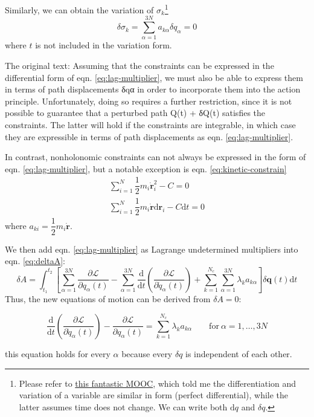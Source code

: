 \documentclass[
  10pt,
  twoside,
  openany,
  b5paper, %
  colorscheme = bootstrap-v4, %
]{qyxf-book}
\numberwithin{equation}{section}
\newcommand{\md}{\mathrm{d}}
\newcommand{\der}[2]{\dfrac{\md #1}{\md #2}}
\newcommand{\p}[2]{\dfrac{\partial #1}{\partial #2}}
\newcommand{\vr}{\boldsymbol{r}}
\newcommand{\vq}{\boldsymbol{q}}
\newcommand{\dvr}{\dot{\vr}}
\newcommand{\dt}{\mathrm{d}t}
\newcommand{\half}{\dfrac{1}{2}}
\newcommand{\sumin}{\sum_{i=1}^N}
\newcommand{\suman}{\sum_{\alpha=1}^{3N}}
\newcommand{\lag}{\mathcal{L}} %
\newcommand{\inttot}{\int_{t_1}^{t_2}}
\begin{document}
Similarly, we can obtain the variation of $\sigma_k$\footnote{Please refer to \href{https://www.bilibili.com/video/BV1xJ411s78q?p=59}{this fantastic MOOC}, which told me the differentiation and variation of a variable are similar in form (perfect differential), while the latter assumes time does not change. We can write both $\md q$ and $\delta q$.}
\begin{equation}
	\delta\sigma_k=\suman a_{k\alpha}\delta q_\alpha=0
\end{equation}
where $t$ is not included in the variation form.

\mynote The original text: Assuming that the constraints can be expressed in the differential form of eqn. \ref{eq:lag-multiplier}, we must also be able to express them in terms of path displacements δqα in order to incorporate them into the action principle. Unfortunately, doing so requires a further restriction, since it is not possible to guarantee that a perturbed path Q(t) + δQ(t) satisfies the constraints. The latter will hold if the constraints are integrable, in which case they are expressible in terms of path displacements as eqn. \ref{eq:lag-multiplier}.

In contrast, nonholonomic constraints can not always be expressed in the form of eqn. \ref{eq:lag-multiplier}, but a notable exception is eqn. \ref{eq:kinetic-constrain}
\begin{gather*}
	\sumin\half m_i\dvr_i^2-C=0\\
	\sumin\half m_i\dvr\md\vr_i-C\dt=0
\end{gather*}
where $a_{ki}=\half m_i\dvr$.

We then add eqn. \ref{eq:lag-multiplier} as Lagrange undetermined multipliers into eqn. \ref{eq:deltaA}:
\begin{equation}
	\delta A=\inttot\left[\suman\p{\lag}{q_\alpha(t)}-\suman\der{}{t}\left(\p{\lag}{\dot{q}_\alpha(t)}\right)+\sum_{k=1}^{N_c}\suman \lambda_ka_{k\alpha}\right]\delta\vq(t)\dt
\end{equation}
Thus, the new equations of motion can be derived from $\delta A=0$:
\begin{tcolorbox}
	\begin{equation}
		\der{}{t}\left(\p{\lag}{\dot{q}_\alpha(t)}\right)-\p{\lag}{q_\alpha(t)}=\sum_{k=1}^{N_c}\lambda_ka_{k\alpha} \qquad \text{for}\ \alpha=1,\dots,3N
	\end{equation}
\end{tcolorbox}
this equation holds for every $\alpha$ because every $\delta q$ is independent of each other.
\end{document}
